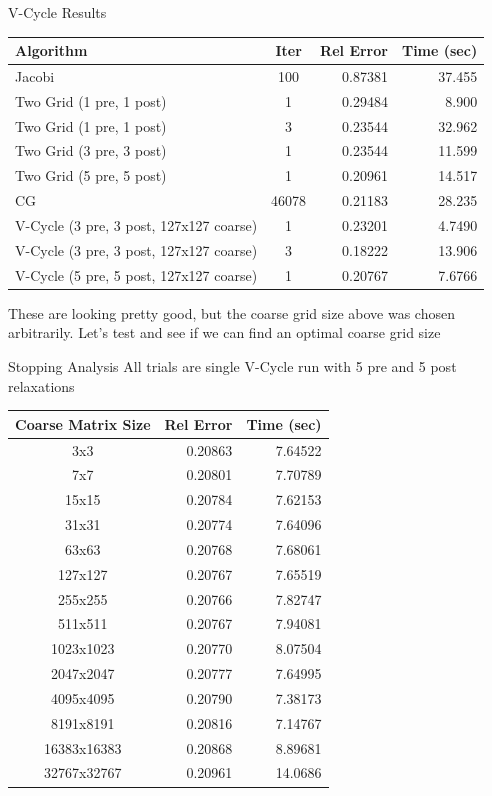 \documentclass[11pt]{beamer}
\begin{document}
  \begin{frame}{V-Cycle Results}
    \begin{table}
      \scriptsize
      \begin{tabular}{lcrr}
        Algorithm & Iter & Rel Error & Time (sec) \\
        \hline
        Jacobi                                  & 100   &  0.87381  & 37.455 \\
        Two Grid (1 pre, 1 post)                & 1	    &  0.29484  &  8.900 \\
        Two Grid (1 pre, 1 post)                & 3	    &  0.23544  & 32.962 \\
        Two Grid (3 pre, 3 post)                & 1	    &  0.23544  & 11.599 \\
        Two Grid (5 pre, 5 post)                & 1     &  0.20961  & 14.517 \\
        CG                                      & 46078 &  0.21183  & 28.235 \\
        V-Cycle (3 pre, 3 post, 127x127 coarse) & 1     &  0.23201  & 4.7490 \\
        V-Cycle (3 pre, 3 post, 127x127 coarse) & 3     &  0.18222  & 13.906 \\
        V-Cycle (5 pre, 5 post, 127x127 coarse) & 1     &  0.20767  & 7.6766
      \end{tabular}
    \end{table}
    These are looking pretty good, but the coarse grid size above was chosen
    arbitrarily.  Let's test and see if we can find an optimal coarse grid size
  \end{frame}
  \begin{frame}{Stopping Analysis}
    All trials are single V-Cycle run with 5 pre and 5 post relaxations
    \begin{table}
      \begin{tabular}{crr}
        Coarse Matrix Size & Rel Error & Time (sec) \\
        \hline
        3x3         & 0.20863 & 7.64522 \\
        7x7         & 0.20801 & 7.70789 \\
        15x15       & 0.20784 & 7.62153 \\
        31x31       & 0.20774 & 7.64096 \\
        63x63       & 0.20768 & 7.68061 \\
        127x127     & 0.20767 & 7.65519 \\
        255x255     & 0.20766 & 7.82747 \\
        511x511     & 0.20767 & 7.94081 \\
        1023x1023   & 0.20770 & 8.07504 \\
        2047x2047   & 0.20777 & 7.64995 \\
        4095x4095   & 0.20790 & 7.38173 \\
        8191x8191   & 0.20816 & 7.14767 \\
        16383x16383 & 0.20868 & 8.89681 \\
        32767x32767 & 0.20961 & 14.0686
      \end{tabular}
    \end{table}
  \end{frame}
\end{document}
